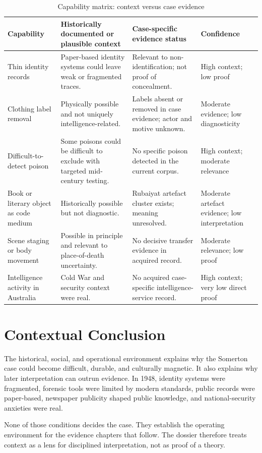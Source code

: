 \begin{table}[htbp]
\centering
\caption{Capability matrix: context versus case evidence}
\label{tab:context-capability-matrix}
\begin{tabularx}{\textwidth}{p{}X p{}p{}}
\toprule
Capability & Historically documented or plausible context & Case-specific evidence status & Confidence \\
\midrule
Thin identity records & Paper-based identity systems could leave weak or fragmented traces. & Relevant to non-identification; not proof of concealment. & High context; low proof \\
Clothing label removal & Physically possible and not uniquely intelligence-related. & Labels absent or removed in case evidence; actor and motive unknown. & Moderate evidence; low diagnosticity \\
Difficult-to-detect poison & Some poisons could be difficult to exclude with targeted mid-century testing. & No specific poison detected in the current corpus. & High context; moderate relevance \\
Book or literary object as code medium & Historically possible but not diagnostic. & Rubaiyat artefact cluster exists; meaning unresolved. & Moderate artefact evidence; low interpretation \\
Scene staging or body movement & Possible in principle and relevant to place-of-death uncertainty. & No decisive transfer evidence in acquired record. & Moderate relevance; low proof \\
Intelligence activity in Australia & Cold War and security context were real. & No acquired case-specific intelligence-service record. & High context; very low direct proof \\
\bottomrule
\end{tabularx}
\end{table}

\section{Contextual Conclusion}

The historical, social, and operational environment explains why the Somerton case could become difficult, durable, and culturally magnetic. It also explains why later interpretation can outrun evidence. In 1948, identity systems were fragmented, forensic tools were limited by modern standards, public records were paper-based, newspaper publicity shaped public knowledge, and national-security anxieties were real.

None of those conditions decides the case. They establish the operating environment for the evidence chapters that follow. The dossier therefore treats context as a lens for disciplined interpretation, not as proof of a theory.
